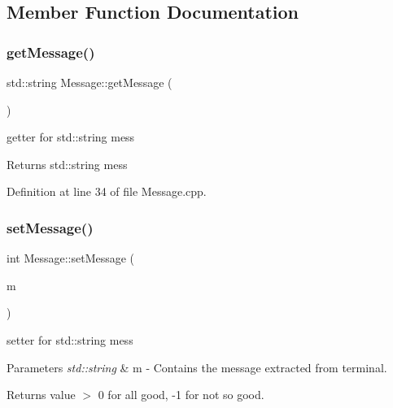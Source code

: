 \subsection{Member Function Documentation}
\mbox{\label{classMessage_a8d2e67a8732ecaeca309df6ac5dda156}} 
\subsubsection{\texorpdfstring{getMessage()}{getMessage()}}
{\footnotesize\ttfamily std\+::string Message\+::get\+Message (\begin{DoxyParamCaption}\item[{void}]{ }\end{DoxyParamCaption})}



getter for std\+::string mess 

\begin{DoxyReturn}{Returns}
std\+::string mess 
\end{DoxyReturn}


Definition at line 34 of file Message.\+cpp.

\mbox{\label{classMessage_aa1e4c60f94308a9367ad3106c34b28f3}} 
\subsubsection{\texorpdfstring{setMessage()}{setMessage()}}
{\footnotesize\ttfamily int Message\+::set\+Message (\begin{DoxyParamCaption}\item[{std\+::string}]{m }\end{DoxyParamCaption})}



setter for std\+::string mess 


\begin{DoxyParams}{Parameters}
{\em std\+::string} & m -\/ Contains the message extracted from terminal. \\
\hline
\end{DoxyParams}
\begin{DoxyReturn}{Returns}
value $>$ 0 for all good, -\/1 for not so good. 
\end{DoxyReturn}


